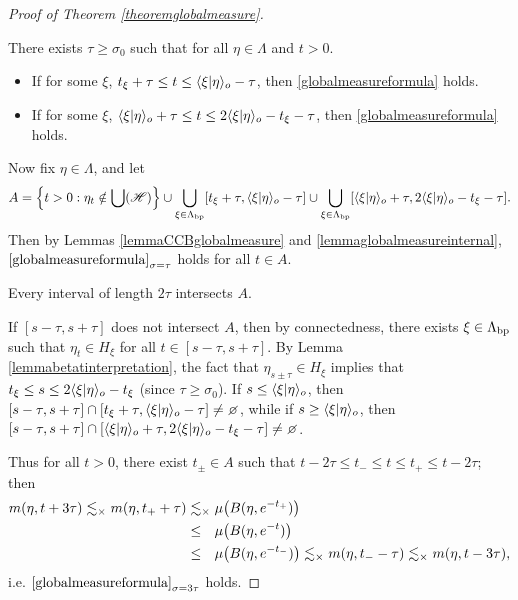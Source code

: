\begin{proof}[Proof of Theorem \ref{theoremglobalmeasure}]
\begin{lemma}
\label{lemmaglobalmeasureinternal}
There exists $\tau\geq \sigma_0$ such that for all $\eta\in\Lambda$ and $t > 0$.
\begin{itemize}
\item[(i)] If for some $\xi$, $t_\xi + \tau \leq t \leq \langle \xi|\eta\rangle_o - \tau$, then \eqref{globalmeasureformula} holds.
\item[(ii)] If for some $\xi$, $\langle \xi|\eta\rangle_o + \tau \leq t \leq 2\langle \xi|\eta\rangle_o - t_\xi - \tau$, then \eqref{globalmeasureformula} holds.
\end{itemize}
\end{lemma}
Now fix $\eta\in\Lambda$, and let
\[
A = \left\{t > 0 : \eta_t\notin\bigcup(\mathscr H)\right\} \cup \bigcup_{\xi\in\Lambda_{\mathrm{bp}}} [t_\xi + \tau,\langle \xi|\eta\rangle_o - \tau]\cup \bigcup_{\xi\in\Lambda_{\mathrm{bp}}}  [\langle \xi|\eta\rangle_o + \tau,2\langle \xi|\eta\rangle_o - t_\xi - \tau].
\]
Then by Lemmas \ref{lemmaCCBglobalmeasure} and \ref{lemmaglobalmeasureinternal}, $\eqref{globalmeasureformula}_{\sigma = \tau}$ holds for all $t\in A$.
\begin{claim}
Every interval of length $2\tau$ intersects $A$.
\end{claim}
\begin{subproof}
If $[s - \tau,s + \tau]$ does not intersect $A$, then by connectedness, there exists $\xi\in\Lambda_{\mathrm{bp}}$ such that $\eta_t\in H_\xi$ for all $t\in [s - \tau, s + \tau]$. By Lemma \ref{lemmabetatinterpretation}, the fact that $\eta_{s\pm\tau}\in H_\xi$ implies that $t_\xi \leq s \leq 2\langle \xi|\eta\rangle_o - t_\xi$ (since $\tau\geq \sigma_0$). If $s \leq \langle \xi|\eta\rangle_o$, then $[s - \tau,s + \tau]\cap [t_\xi + \tau,\lb \xi|\eta\rb_\zero - \tau] \neq \emptyset$, while if $s \geq \langle \xi|\eta\rangle_o$, then $[s - \tau,s + \tau]\cap [\lb \xi|\eta\rb_\zero + \tau,2\lb \xi|\eta\rb_\zero - t_\xi - \tau] \neq \emptyset$.
\end{subproof}
Thus for all $t > 0$, there exist $t_\pm\in A$ such that $t - 2\tau \leq t_- \leq t \leq t_+ \leq t - 2\tau$; then
\begin{align*}
m(\eta,t + 3\tau)
\lesssim_\times m(\eta,t_+ + \tau)
&\lesssim_\times \mu\big(B(\eta,e^{-t_+})\big)\\
&\leq_\pt \mu\big(B(\eta,e^{-t})\big)\\
&\leq_\pt \mu\big(B(\eta,e^{-t_-})\big)
\lesssim_\times m(\eta,t_- - \tau)
\lesssim_\times m(\eta,t - 3\tau),
\end{align*}
i.e. $\eqref{globalmeasureformula}_{\sigma = 3\tau}$ holds.

\end{proof}

